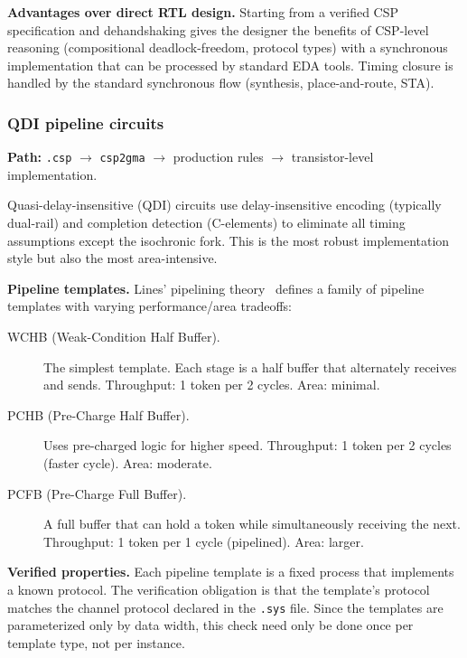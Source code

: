 \documentclass[11pt]{article}
\begin{document}
\textbf{Advantages over direct RTL design.}
Starting from a verified CSP specification and dehandshaking gives the
designer the benefits of CSP-level reasoning (compositional
deadlock-freedom, protocol types) with a synchronous implementation
that can be processed by standard EDA tools.  Timing closure is
handled by the standard synchronous flow (synthesis, place-and-route,
STA).

\subsubsection{QDI pipeline circuits}
\label{sec:qdi}

\textbf{Path:} \texttt{.csp} $\to$ \texttt{csp2gma} $\to$
production rules $\to$ transistor-level implementation.

Quasi-delay-insensitive (QDI) circuits use delay-insensitive encoding
(typically dual-rail) and completion detection (C-elements) to
eliminate all timing assumptions except the isochronic fork.  This is
the most robust implementation style but also the most
area-intensive.

\textbf{Pipeline templates.}
Lines' pipelining theory~\cite{lines1998} defines a family of pipeline
templates with varying performance/area tradeoffs:

\begin{description}
\item[WCHB (Weak-Condition Half Buffer).]
  The simplest template.  Each stage is a half buffer that
  alternately receives and sends.  Throughput: 1 token per 2 cycles.
  Area: minimal.

\item[PCHB (Pre-Charge Half Buffer).]
  Uses pre-charged logic for higher speed.  Throughput: 1 token per
  2 cycles (faster cycle).  Area: moderate.

\item[PCFB (Pre-Charge Full Buffer).]
  A full buffer that can hold a token while simultaneously receiving
  the next.  Throughput: 1 token per 1 cycle (pipelined).
  Area: larger.
\end{description}

\textbf{Verified properties.}
Each pipeline template is a fixed process that implements a known
protocol.  The verification obligation is that the template's protocol
matches the channel protocol declared in the \texttt{.sys} file.
Since the templates are parameterized only by data width, this check
need only be done once per template type, not per instance.
\end{document}
